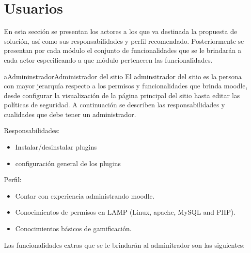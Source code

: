 \section{Usuarios}
\label{analisis:usuarios}

 En esta sección se presentan los actores a los que va destinada la propuesta de
 solución, así como sus responsabilidades y perfil recomendado. Posteriormente se
 presentan por cada módulo el conjunto de funcionalidades que se le brindarán a
 cada actor especificando a que módulo pertenecen las funcionalidades.


    \begin{actor}{aAdmininstrador}{Administrador del sitio}{%
        El adminsitrador del sitio es la persona con mayor jerarquía respecto
        a los permisos y funcionalidades que brinda moodle, desde configurar la
        visualización de la página principal del sitio hasta editar las políticas
        de seguridad. A continuación se describen las responsabilidades y cualidades
        que debe tener un administrador.}

    \item[Responsabilidades:] \hfill
        \begin{itemize}
        \item Instalar/desinstalar plugins
        \item configuración general de los plugins
        \end{itemize}

    \item[Perfil:] \hfill
        \begin{itemize}
        \item Contar con experiencia administrando moodle.
        \item Conocimientos de permisos en LAMP (Linux, apache, MySQL and PHP).
        \item Conocimientos básicos de gamificación.\\
        \end{itemize}
    \end{actor}

 \noindent
 Las funcionalidades extras que se le brindarán al adminitrador son las siguientes:

